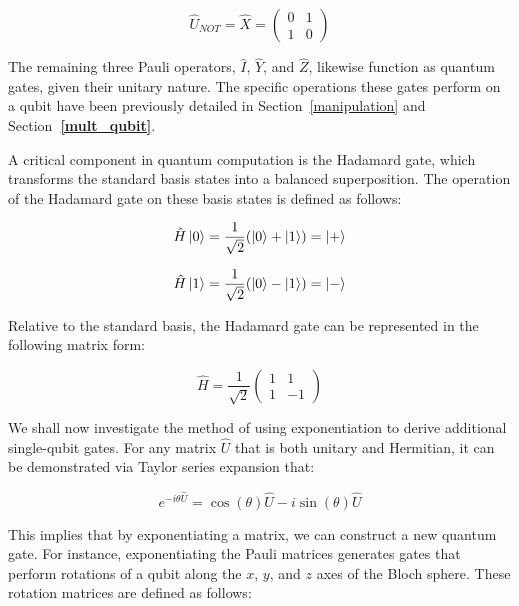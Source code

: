 \documentclass[en]{dimscthesis}
\begin{document}
\begin{equation}
	\hat{U}_{NOT} = \hat{X} 
	= \begin{pmatrix} 
		0 & 1 \\ 
		1 & 0 
	\end{pmatrix} 
	\label{eq:Unot}
\end{equation}

The remaining three Pauli operators, $\hat{I}$, $\hat{Y}$, and $\hat{Z}$, likewise function as quantum gates, given their unitary nature. The specific operations these gates perform on a qubit have been previously detailed in Section~\ref{manipulation} and Section\textbf{~\ref{mult_qubit}}.

A critical component in quantum computation is the Hadamard gate, which transforms the standard basis states into a balanced superposition. The operation of the Hadamard gate on these basis states is defined as follows:

\begin{equation}
	\hat{H}\ket{0} = \frac{1}{\sqrt{2}} (\ket{0} + \ket{1}) = \ket{+} 
	\label{eq:ket_plus}
\end{equation}

\begin{equation}
	\hat{H}\ket{1} = \frac{1}{\sqrt{2}} (\ket{0} - \ket{1}) = \ket{-} 
	\label{eq:ket_minus}
\end{equation}

Relative to the standard basis, the Hadamard gate can be represented in the following matrix form:

\begin{equation}
	\hat{H} = \frac{1}{\sqrt{2}} \begin{pmatrix} 
		1 & 1 \\ 
		1 & -1 
	\end{pmatrix} 
	\label{eq:hadamard_matrix}
\end{equation}

We shall now investigate the method of using exponentiation to derive additional single-qubit gates. For any matrix $\hat{U}$ that is both unitary and Hermitian, it can be demonstrated via Taylor series expansion that:

\begin{equation}
	e^{-i\theta \hat{U} } = \cos(\theta)\hat{U} - i\sin(\theta)\hat{U}
	\label{eq:exp_theta}
\end{equation}

This implies that by exponentiating a matrix, we can construct a new quantum gate. For instance, exponentiating the Pauli matrices generates gates that perform rotations of a qubit along the $x$, $y$, and $z$ axes of the Bloch sphere. These rotation matrices are defined as follows:
\end{document}
